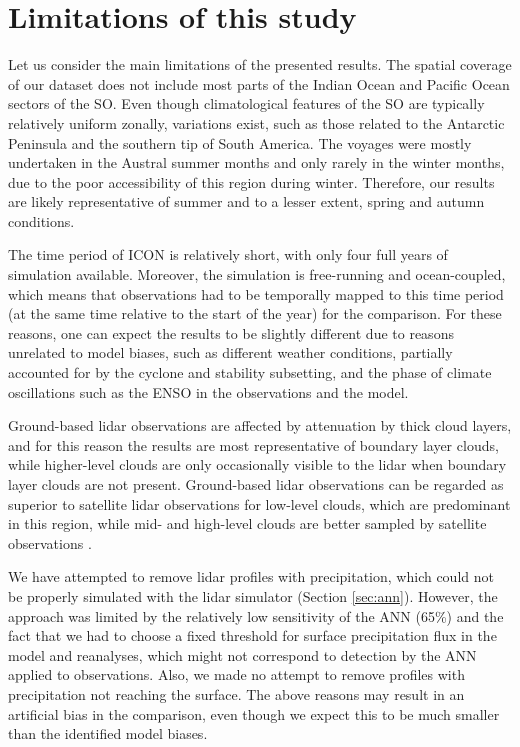\documentclass[draft]{agujournal2019}
\begin{document}
\section{Limitations of this study}

Let us consider the main limitations of the presented results. The spatial
coverage of our dataset does not include most parts of the Indian Ocean and
Pacific Ocean sectors of the SO. Even though climatological features of the SO
are typically relatively uniform zonally, variations exist, such as those
related to the Antarctic Peninsula and the southern tip of South America. The
voyages were mostly undertaken in the Austral summer months and only rarely in
the winter months, due to the poor accessibility of this region during winter.
Therefore, our results are likely representative of summer and to a lesser
extent, spring and autumn conditions.

The time period of ICON is relatively short, with only four full years of
simulation available. Moreover, the simulation is free-running and
ocean-coupled, which means that observations had to be temporally mapped to
this time period (at the same time relative to the start of the year) for the
comparison. For these reasons, one can expect the results to be slightly
different due to reasons unrelated to model biases, such as different weather
conditions, partially accounted for by the cyclone and stability subsetting,
and the phase of climate oscillations such as the ENSO in the observations and
the model.

Ground-based lidar observations are affected by attenuation by thick cloud
layers, and for this reason the results are most representative of boundary
layer clouds, while higher-level clouds are only occasionally visible to the
lidar when boundary layer clouds are not present. Ground-based lidar
observations can be regarded as superior to satellite lidar observations for
low-level clouds, which are predominant in this region, while mid- and
high-level clouds are better sampled by satellite observations
.

We have attempted to remove lidar profiles with precipitation, which could not
be properly simulated with the lidar simulator (Section \ref{sec:ann}).
However, the approach was limited by the relatively low sensitivity of the ANN
(65\%) and the fact that we had to choose a fixed threshold for surface
precipitation flux in the model and reanalyses, which might not correspond to
detection by the ANN applied to observations. Also, we made no attempt to
remove profiles with precipitation not reaching the surface. The above reasons
may result in an artificial bias in the comparison, even though we expect this
to be much smaller than the identified model biases.
\end{document}
